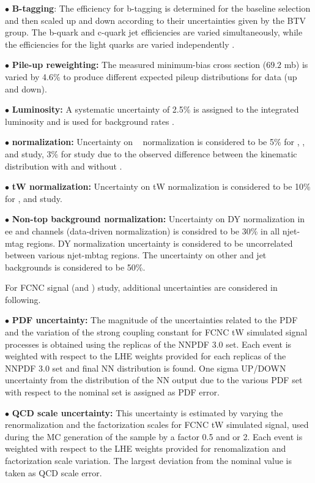 $\bullet$  \textbf{B-tagging}: The efficiency for b-tagging is determined for the baseline selection and then scaled up and down according to their uncertainties given by the BTV group. The b-quark and c-quark jet efficiencies are varied simultaneously, while the efficiencies for the light quarks are varied independently \cite{btag}.

$\bullet$  \textbf{Pile-up reweighting:} The measured minimum-bias cross section ($69.2$ mb) is varied by 4.6\% to produce
different expected pileup distributions for data (up and down).

$\bullet$ \textbf{Luminosity:} A systematic uncertainty of 2.5\% is assigned to the integrated luminosity
and is used for background rates \cite{CMS-PAS-LUM-17-001}.

$\bullet$ \textbf{\ttbar normalization:} Uncertainty on \ttbar~ normalization is considered to be  5\% \cite{Khachatryan:2016kzg} for \Ophiq, \OtW, \OuG and \OcG study, 3\% for \OG study due to the observed difference between the \ttbar kinematic distribution with and without \OG.

$\bullet$ \textbf{tW normalization:} Uncertainty on tW normalization is considered to be  10\% for \OuG, \OcG and \OG study.

$\bullet$ \textbf{Non-top background normalization:} Uncertainty on DY normalization in ee and \mumu channels (data-driven normalization) is considred to be 30\% in all njet-mtag regions. DY normalization uncertainty is considered to be uncorrelated between various njet-mbtag regions. The uncertainty on other and jet backgrounds is considered to be 50\%.

\medskip
For FCNC signal (\OuG and \OcG) study, additional uncertainties are considered in following.

   $\bullet$ \textbf{PDF uncertainty:} The magnitude of the uncertainties related to the PDF and the variation of the strong coupling constant for FCNC tW simulated signal processes is obtained using the replicas of the NNPDF 3.0 set. Each event is weighted with respect to the LHE weights provided for each replicas of the NNPDF 3.0 set and final NN distribution is found. One sigma UP/DOWN uncertainty from the distribution of the NN output due to the various PDF set  with respect to  the nominal set is assigned as PDF error.

   $\bullet$ \textbf{QCD scale uncertainty:} This uncertainty is estimated by varying the renormalization and the factorization scales for FCNC tW simulated signal, used during the MC generation of the sample by a factor 0.5 and or 2. Each event is weighted with respect to the LHE weights provided for renomalization and factorization scale variation. The largest deviation from the nominal value is taken as QCD scale error.

